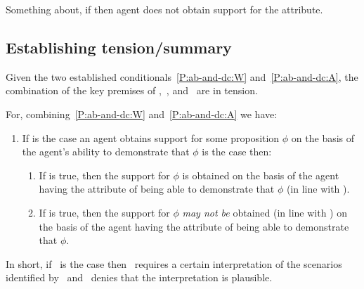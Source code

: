 \begin{note}
  Something about, if \eA{} then agent does not obtain support for the attribute.
\end{note}

\subsection{Establishing tension/summary}
\label{sec:establishing-tension}

\begin{note}[Summary]
  Given the two established conditionals~\ref{P:ab-and-dc:W} and~\ref{P:ab-and-dc:A}, the combination of the key premises of \uRa{},~\eA{}, and~\nI{} are in tension.

  For, combining~\ref{P:ab-and-dc:W} and~\ref{P:ab-and-dc:A} we have:
  \begin{enumerate}[label=(CC), ref=(CC)]
  \item If \eA{} is the case an agent obtains support for some proposition \(\phi\) on the basis of the agent's ability to demonstrate that \(\phi\) is the case then:
    \begin{enumerate}[label=(C\arabic*\(\sim\)), ]
    \item If \uRa{} is true, then the support for \(\phi\) is obtained on the basis of the agent having the attribute of being able to demonstrate that \(\phi\) (in line with \AR{}).
    \item If \nI{} is true, then the support for \(\phi\) \emph{may not be} obtained (in line with \AR{}) on the basis of the agent having the attribute of being able to demonstrate that \(\phi\).
    \end{enumerate}
  \end{enumerate}
  In short, if~\eA{} is the case then~\uRa{} requires a certain interpretation of the scenarios identified by~\eA{} and~\nI{} denies that the interpretation is plausible.
\end{note}


